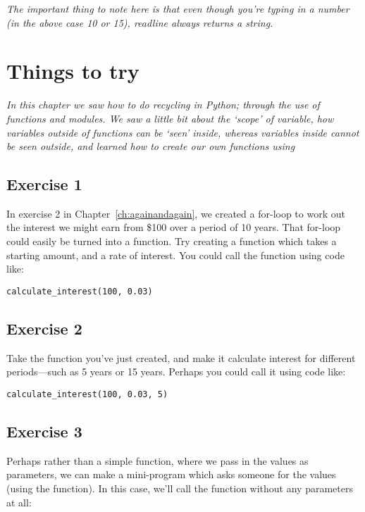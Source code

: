 \noindent
\emph{The important thing to note here is that even though you're typing in a number (in the above case 10 or 15), readline always returns a string.}


\section{Things to try}

\emph{In this chapter we saw how to do recycling in Python; through the use of functions and modules.  We saw a little bit about the `scope' of variable, how variables outside of functions can be `seen' inside, whereas variables inside cannot be seen outside, and learned how to create our own functions using }

\subsection*{Exercise 1}
In exercise 2 in Chapter~\ref{ch:againandagain}, we created a for-loop to work out the interest we might earn from \$100 over a period of 10 years.  That for-loop could easily be turned into a function.  Try creating a function which takes a starting amount, and a rate of interest.  You could call the function using code like:

\begin{Verbatim}[frame=single]
calculate_interest(100, 0.03)
\end{Verbatim}

\subsection*{Exercise 2}
Take the function you've just created, and make it calculate interest for different periods---such as 5 years or 15 years.  Perhaps you could call it using code like:

\begin{Verbatim}[frame=single]
calculate_interest(100, 0.03, 5)
\end{Verbatim}

\subsection*{Exercise 3}
Perhaps rather than a simple function, where we pass in the values as parameters, we can make a mini-program which asks someone for the values (using the  function).  In this case, we'll call the function without any parameters at all:

